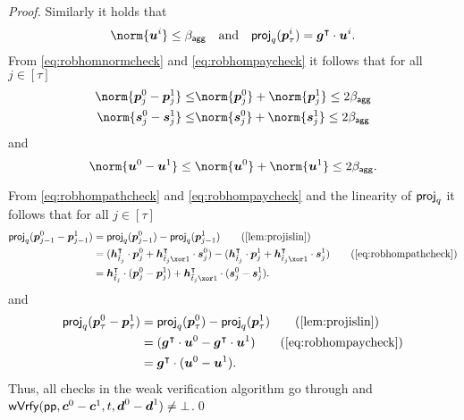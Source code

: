\begin{proof}
  Similarly it holds that
  \begin{align}
  \norm{\vec{u}^i} \leq \bagg\quad \text{and}\quad \proj_q(\vec{p}^i_{\tau}) = \vec{g}^\intercal\cdot \vec{u}^i.\label{eq:robhompaycheck}
  \end{align}
  From \autoref{eq:robhomnormcheck} and \autoref{eq:robhompaycheck} it follows that for all $j \in [\tau]$
  \begin{align*}
    \norm{\vec{p}_j^0-\vec{p}_j^1} \leq& \norm{\vec{p}_j^0} + \norm{\vec{p}_j^1} \leq 2\bagg\\
    \norm{\vec{s}_j^0-\vec{s}_j^1} \leq& \norm{\vec{s}_j^0} + \norm{\vec{s}_j^1} \leq 2\bagg
  \end{align*}
  and
  \[
      \norm{\vec{u}^0-\vec{u}^1} \leq \norm{\vec{u}^0} + \norm{\vec{u}^1} \leq 2\bagg.
  \]
  
  From \autoref{eq:robhompathcheck} and \autoref{eq:robhompaycheck} and the linearity of $\mathsf{proj}_q$ it follows that for all $j \in [\tau]$
  \begin{align*}
    \proj_q(\vec{p}^0_{j-1}-\vec{p}^1_{j-1})
    ={}&\proj_q(\vec{p}^0_{j-1})-\proj_q(\vec{p}^1_{j-1})\tag{\autoref{lem:projislin}}\\
    ={}&(\vec{h}_{\tilde t_j}^\intercal\cdot \vec{p}^0_{j} + \vec{h}_{\tilde t_j\xor 1}^\intercal \cdot \vec{s}^0_{j})- (\vec{h}_{\tilde t_j}^\intercal\cdot \vec{p}^1_{j} + \vec{h}_{\tilde t_j\xor 1}^\intercal \cdot \vec{s}^1_{j})\tag{\autoref{eq:robhompathcheck}}\\
  ={}&\vec{h}_{\tilde t_j}^\intercal\cdot (\vec{p}^0_{j} - \vec{p}^1_{j}) + \vec{h}_{\tilde t_j\xor 1}^\intercal \cdot (\vec{s}^0_{j} - \vec{s}^1_{j}).
  \end{align*}
  and
  \begin{align*}
    \proj_q(\vec{p}^0_{\tau}-\vec{p}^1_{\tau})
    ={}&\proj_q(\vec{p}^0_{\tau})-\proj_q(\vec{p}^1_{\tau})\tag{\autoref{lem:projislin}}\\
    ={}&(\vec{g}^\intercal\cdot \vec{u}^0 - \vec{g}^\intercal \cdot \vec{u}^1)\tag{\autoref{eq:robhompaycheck}}\\
  ={}&\vec{g}^\intercal\cdot (\vec{u}^0 - \vec{u}^1).
  \end{align*}
  Thus, all checks in the weak verification algorithm go through and $\mathsf{wVrfy}(\mathsf{pp},\boldsymbol{c}^0-\boldsymbol{c}^1, t,\boldsymbol{d}^0-\boldsymbol{d}^1)\neq\bot$.\qed
\end{proof}

